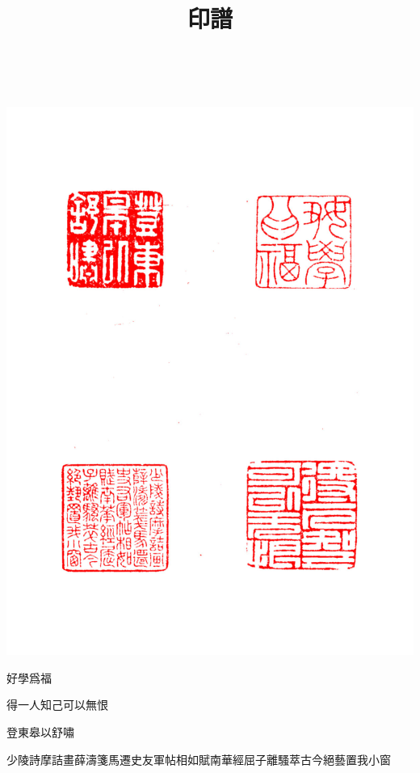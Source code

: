 \documentclass{zhvt-classic}
\title{印譜}
\begin{document}
~\vspace{-0.25\baselineskip}

\hfil \includegraphics[angle=90]{stamp01}
\clearpage

好學爲福

得一人知己可以無恨

登東皋以舒嘯

少陵詩摩詰畫薛濤箋馬遷史友軍帖相如賦南華經屈子離騷萃古今絕藝置我小窗

\clearpage
~\vspace{-0.25\baselineskip}
\end{document}
